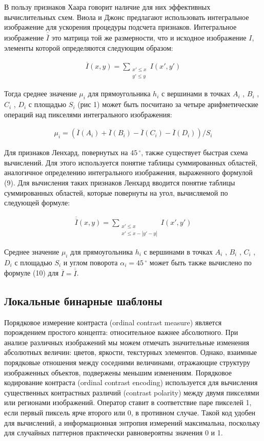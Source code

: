 \documentclass[a4paper, 12pt]{article}		%
\begin{document}
В пользу признаков Хаара говорит наличие для них эффективных вычислительных схем. Виола и Джонс предлагают использовать интегральное изображение для ускорения процедуры подсчета признаков. Интегральное изображение $\overline{\overline{I}}$ это матрица той же размерности, что и исходное изображение $I$, элементы которой определяются следующим образом:

\begin{gather}
\overline{I}(x,y) = \sum\limits_{\substack{x' \le x\\y' \le y}} I(x',y')
\end{gather}

Тогда среднее значение $\mu_i$ для прямоугольника $h_i$ с вершинами в точках $A_i$ , $B_i$ , $C_i$ , $D_i$ с площадью $S_i$ (рис 1) может быть посчитано за четыре арифметические операций над пикселями интегрального изображения:

\begin{gather}
\mu_i = (\overline{I}(A_i) + \overline{I}(B_i) - \overline{I}(C_i) - \overline{I}(D_i)) / S_i
\end{gather}

Для признаков Ленхард, повернутых на $45\,^{\circ}$, также существует быстрая схема вычислений. Для этого используется понятие таблицы суммированных областей, аналогичное определению интегрального изображения, выраженного формулой (9). Для вычисления таких признаков Ленхард вводится понятие таблицы суммированных областей, которые повернуты на угол, вычисляемой по следующей формуле:

\begin{gather}
\overline{\overline{I}}(x,y) = \sum\limits_{\substack{x' \le x\\x' \le x - |y' - y|}} I(x',y')
\end{gather}

Среднее значение $\mu_i$ для прямоугольника $h_i$ с вершинами в точках $A_i$ , $B_i$ , $C_i$ , $D_i$ с площадью $S_i$ и углом поворота $\alpha_i = 45\,^{\circ}$ может быть также вычислено по формуле (10) для $\overline{I} = \overline{\overline{I}}$.

\subsection{Локальные бинарные шаблоны}

Порядковое измерение контраста (ordinal contrast measure) является порождением простого концепта: относительное важнее абсолютного. При анализе различных изображений мы можем отмечать значительные изменения абсолютных величин: цветов, яркости, текстурных элементов. Однако, взаимные порядковые отношения между соседними величинами, отражающие структуру изображенных объектов, подвержены меньшим изменениям. Порядковое кодирование контраста (ordinal contrast encoding) используется для вычисления существенных контрастных различий (contrast polarity) между двумя пикселями или регионами изображений. Оператор ставит в соответствие паре пикселей 1, если первый пиксель ярче второго или 0, в противном случае. Такой код удобен для вычислений, а информационная энтропия измерений максимальна, поскольку для случайных паттернов практически равновероятны значения 0 и 1.
\end{document}
